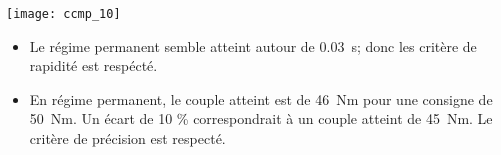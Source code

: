 \fi


\ifprof
\else
\begin{marginfigure}
\texttt{[image: ccmp\_10]}
\end{marginfigure}
\fi

\ifprof
\begin{corrige}
\begin{itemize}
\item Le régime permanent semble atteint autour de \SI{0,03}{s}; donc les critère de rapidité est respécté.
\item En régime permanent, le couple atteint est de \SI{46}{Nm} pour une consigne de \SI{50}{Nm}. Un écart de 10 \% correspondrait à un couple atteint de \SI{45}{Nm}. Le critère de précision est respecté.
\end{itemize}
\end{corrige}
\else
\fi




\ifprof
\else

\ifcolle
\else
{}
\fi


\fi